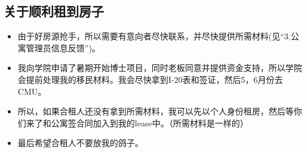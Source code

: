 \documentclass[nofonts,a4paper,11pt]{article}
\begin{document}
\subsection{关于顺利租到房子}
\begin{itemize}
	\item 由于好房源抢手，所以需要有意向者尽快联系，并尽快提供所需材料(见“3.公寓管理员信息反馈”)。
	\item 我向学院申请了暑期开始博士项目，同时老板同意并提供资金支持，所以学院会提前处理我的移民材料。我会尽快拿到I-20表和签证，然后5，6月份去CMU。
	\item 所以，如果合租人还没有拿到所需材料，我可以先以个人身份租房，然后等你们来了和公寓签合同加入到我的lease中。（所需材料是一样的）
	\item 最后希望合租人不要放我的鸽子。
\end{itemize}
\end{document}
